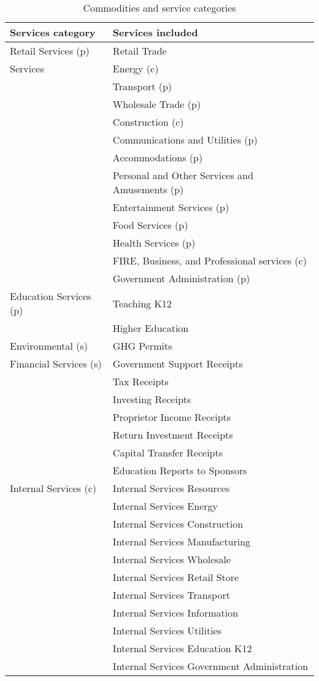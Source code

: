 \begin{table}
\centering
\caption{Commodities and service categories}\label{tab:service-categories}
\fontsize{11.5}{14.375}\rm
\begin{tabular}{|l|l|}
\hline
Services category & Services included \\
\hline
Retail Services (p) & Retail Trade \\
\hline
Services & Energy (c) \\
 & Transport (p) \\
 & Wholesale Trade (p) \\
 & Construction (c) \\
 & Communications and Utilities (p) \\
 & Accommodations (p) \\
 & Personal and Other Services and Amusements (p) \\
 & Entertainment Services (p) \\
 & Food Services (p) \\
 & Health Services (p) \\
 & FIRE, Business, and Professional services (c) \\
 & Government Administration (p) \\
\hline
Education Services (p) & Teaching K12 \\
 & Higher Education \\
\hline
Environmental (s) & GHG Permits \\
\hline
Financial Services (s) & Government Support Receipts \\
 & Tax Receipts \\
 & Investing Receipts \\
 & Proprietor Income Receipts \\
 & Return Investment Receipts \\
 & Capital Transfer Receipts \\
 & Education Reports to Sponsors \\
\hline
Internal Services (c) & Internal Services Resources \\
 & Internal Services Energy \\
 & Internal Services Construction \\
 & Internal Services Manufacturing \\
 & Internal Services Wholesale \\
 & Internal Services Retail Store \\
 & Internal Services Transport \\
 & Internal Services Information \\
 & Internal Services Utilities \\
 & Internal Services Education K12 \\
 & Internal Services Government Administration \\
\hline
\end{tabular}
\end{table}